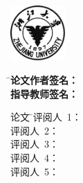 
\newpage
\cleardoublepage  %
\thispagestyle{empty}

\vspace{7.5mm}%

\begin{center}
\xunderline[115mm]{\linespread{1.1}\xiaoer\Fangsong\bfseries\centerline\zjutitlec}
\ifthenelse{\equal\zjutitlecb{}}{}{\\[2mm]\xunderline[115mm]{\linespread{1.1}\xiaoer\Fangsong\bfseries\centerline\zjutitlecb}}
\ifthenelse{\equal\zjutitlecc{}}{}{\\[2mm]\xunderline[115mm]{\linespread{1.1}\xiaoer\Fangsong\bfseries\centerline\zjutitlecc}}
\end{center}

\vspace{7.5mm}%

\begin{center}
  \includegraphics[width=21mm]{images/zjulogo.pdf}%
\end{center}

\vspace{4.5mm}%

\begin{tabbing}
\hspace{30mm} \= \Songti\xiaosan\bfseries 论文作者签名： \= \underline{\makebox[5cm]{}} \\[8mm]
              \> \Songti\xiaosan\bfseries 指导教师签名： \> \underline{\makebox[5cm]{}}
\end{tabbing}

\vspace{12mm}%

\begin{tabbing}
\hspace{10mm} \Songti\sihao 论文 \hspace{-2.6mm} \= \Songti\sihao 评阅人~1： \= \underline{\makebox[9cm]{\sihao\zjurevieweronec}} \\
              \> \Songti\sihao 评阅人~2： \> \underline{\makebox[9cm]{\sihao\zjureviewertwoc}} \\
              \> \Songti\sihao 评阅人~3： \> \underline{\makebox[9cm]{\sihao\zjureviewerthreec}} \\
              \> \Songti\sihao 评阅人~4： \> \underline{\makebox[9cm]{\sihao\zjureviewerfourc}} \\
              \> \Songti\sihao 评阅人~5： \> \underline{\makebox[9cm]{\sihao\zjureviewerfivec}}
\end{tabbing}


